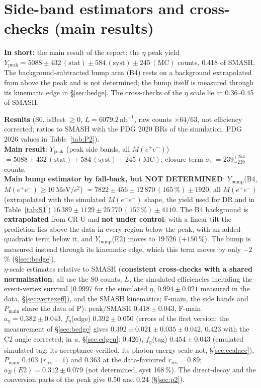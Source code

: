 \documentclass[11pt,a4paper]{article}
\newcommand{\Mee}{\ensuremath{M(e^{+}e^{-})}\xspace}
\newcommand{\nbinv}{\ensuremath{\mathrm{nb}^{-1}}\xspace}
\newcommand{\MeVcc}{\ensuremath{\mathrm{MeV}/c^{2}}\xspace}
\newcommand{\Pmain}{\ensuremath{P_{\mathrm{main}}}\xspace}
\newcommand{\aEta}{\ensuremath{a_\eta}\xspace}
\newcommand{\Ybump}{\ensuremath{Y_{\mathrm{bump}}}\xspace}
\newcommand{\Ypeak}{\ensuremath{Y_{\mathrm{peak}}}\xspace}
\newcommand{\notebox}[1]{\par\noindent\colorbox{orange!10}{\parbox{\dimexpr\linewidth-2\fboxsep\relax}{#1}}\par}
\newcommand{\tipbox}[1]{\par\noindent\colorbox{blue!6}{\parbox{\dimexpr\linewidth-2\fboxsep\relax}{#1}}\par}
\newcommand{\inshort}[1]{\tipbox{\textbf{In short:} #1}}%
\begin{document}
\section{Side-band estimators and cross-checks (main results)}
\label{sec:sb}
\inshort{the main result of the report: the $\eta$ peak yield $\Ypeak=5088\pm432\,(\mathrm{stat})\pm584\,(\mathrm{syst})\pm245\,(\mathrm{MC})$ counts, 0.418 of SMASH. The background-subtracted bump area (B4) rests on a background extrapolated from above the peak and is not determined; the bump itself is measured through its kinematic edge in \S\ref{sec:bedge}. The cross-checks of the $\eta$ scale lie at 0.36--0.45 of SMASH.}
\notebox{\textbf{Results} (S0, isBest $\ge0$, $L=6079.2\,\nbinv$, raw counts $\times64/63$, not efficiency corrected; ratios to SMASH with the
PDG 2020 BRs of the simulation, PDG 2026 values in Table~\ref{tab:P2}).\\
\textbf{Main result}: $\Ypeak$ (peak side bands, all \Mee) $=5088\pm432\,(\mathrm{stat})\pm584\,(\mathrm{syst})\pm245\,(\mathrm{MC})$;
closure term $\sigma_{\mathrm{tr}}=239^{+254}_{-239}$ counts.\\
\textbf{Main bump estimator by fall-back, but NOT DETERMINED}: \Ybump (B4, \Mee$\ge10$\,\MeVcc) $=7822\pm456\pm12\,870\,(165\,\%)\pm1920$;
all \Mee (extrapolated with the simulated \Mee shape, the yield used for DR and in Table~\ref{tab:S1}) $16\,389\pm1129\pm25\,770\,(157\,\%)\pm4110$.
The B4 background is \textbf{extrapolated} from CR-U and \textbf{not under control}: with a linear tilt the prediction lies above the
data in every region below the peak, with an added quadratic term below it, and \Ybump(E2) moves to 19\,526 ($+150$\,\%). The bump is
measured instead through its kinematic edge, which this term moves by only $-2$\,\% (\S\ref{sec:bedge}).\\
$\eta$-scale estimates relative to SMASH (\textbf{consistent cross-checks with a shared normalisation}: all use the S0 counts, $L$, the simulated
efficiencies including the event-vertex survival (0.9997 for the simulated $\eta$, $0.994\pm0.021$ measured in the data,
\S\ref{sec:vertexeff}), and the SMASH kinematics; F-main, the side bands and \Pmain share the data of P):
peak/SMASH $0.418\pm0.043$, F-main $\aEta=0.382\pm0.043$, $f_\eta$(edge) $0.392\pm0.050$ (errors of the first version; the measurement of
\S\ref{sec:bedge} gives $0.392\pm0.021\pm0.035\pm0.042$, 0.423 with the C2 angle corrected; in $u$, \S\ref{sec:edgeu}: 0.426), $f_\eta$(tag)
$0.454\pm0.043$ (emulated simulated tag; its acceptance verified, its photon-energy scale not, \S\ref{sec:ecalacc}), \Pmain 0.403 ($r_{\mathrm{res}}=1$) and 0.363 at the data-favoured $r_{\mathrm{res}}=0.89$; $a_B(E2)=0.312\pm0.079$ (not
determined, syst 168\,\%). The direct-decay and the conversion parts of the peak give 0.50 and 0.24 (\S\ref{sec:p2}).}
\end{document}
